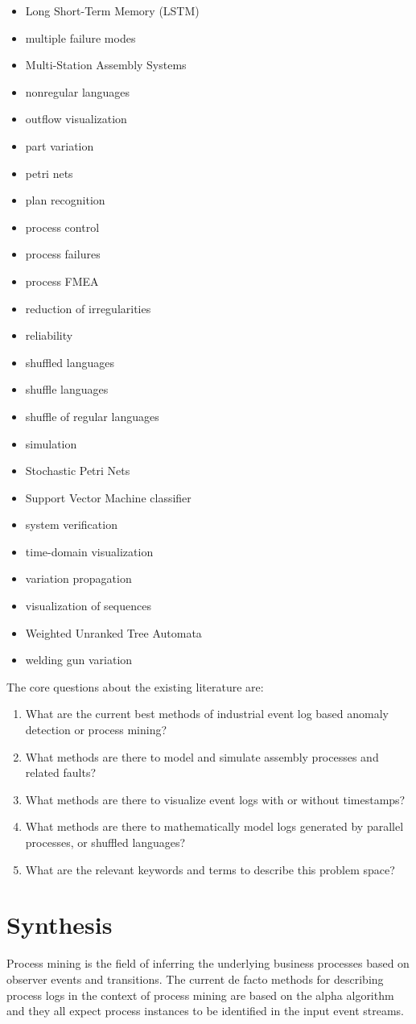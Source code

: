 \documentclass[a4paper,10pt]{article}
\begin{document}
\begin{itemize}
 \item Long Short-Term Memory (LSTM)
 \item multiple failure modes
 \item Multi-Station Assembly Systems
 \item nonregular languages
 \item outflow visualization
 \item part variation
 \item petri nets
 \item plan recognition
 \item process control
 \item process failures
 \item process FMEA
 \item reduction of irregularities
 \item reliability
 \item shuffled languages
 \item shuffle languages
 \item shuffle of regular languages
 \item simulation
 \item Stochastic Petri Nets
 \item Support Vector Machine classifier
 \item system verification
 \item time-domain visualization
 \item variation propagation
 \item visualization of sequences
 \item Weighted Unranked Tree Automata
 \item welding gun variation
\end{itemize}

The core questions about the existing literature are:
\begin{enumerate}
 \item What are the current best methods of industrial event log based anomaly detection or process mining?
 \item What methods are there to model and simulate assembly processes and related faults?
 \item What methods are there to visualize event logs with or without timestamps?
 \item What methods are there to mathematically model logs generated by parallel processes, or shuffled languages?
 \item What are the relevant keywords and terms to describe this problem space?
\end{enumerate}

\section{Synthesis}

Process mining is the field of inferring the underlying business processes based on observer events and transitions.
The current de facto methods for describing process logs in the context of process mining are based on the alpha algorithm and they all expect process instances
to be identified in the input event streams.
\end{document}
